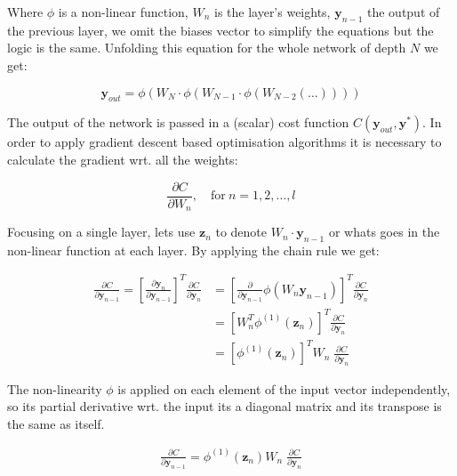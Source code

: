 \documentclass{article}
\begin{document}
    Where $\phi$ is a non-linear function, $W_n$ is the layer's weights, $\bm{y}_{n-1}$ the output of the previous layer, we omit the biases vector to simplify the equations but the logic is the same.
    Unfolding this equation for the whole network of depth $N$ we get:

    \begin{equation}
        \bm{y}_{out} = \phi ( W_{N} \cdot \phi(W_{N-1} \cdot  \phi(W_{N-2}( \dots ))))
    \end{equation}

    The output of the network is passed in a (scalar) cost function $C(\bm{y}_{out},\bm{y}^*)$.
    In order to apply gradient descent based optimisation algorithms it is necessary to calculate the gradient wrt.
    all the weights:

    \begin{equation}
        \frac{ \partial C}{\partial W_{n} }, \quad \text{for} \ n=1,2,\dots,l
    \end{equation}

    Focusing on a single layer, lets use $\textbf{z}_{n}$ to denote $W_{n}\cdot \textbf{y}_{n-1}$ or whats goes in the non-linear function at each layer.
    By applying the chain rule we get:

    \begin{align}
        \frac{ \partial C}{\partial \textbf{y}_{n-1} }
        =
        \left[ \frac{ \partial \textbf{y}_{n}}{\partial \textbf{y}_{n-1}  } \right]^T
        \frac{ \partial C}{\partial \textbf{y}_{n} }
        &=
        \left[ \frac{ \partial}{\partial \textbf{y}_{n-1} } \phi(W_n \textbf{y}_{n-1}) \right]^T
        \frac{ \partial C}{\partial \textbf{y}_{n} }
        \\
        &=
        \left[ W_n^T \phi^{(1)}( \pmb{z}_n ) \right]^T
        \frac{ \partial C}{\partial \textbf{y}_{n} }
        \\
        &=
        \left[ \phi^{(1)}( \pmb{z}_n ) \right]^T
        W_n \;
        \frac{ \partial C}{\partial \textbf{y}_{n} }
    \end{align}

    The non-linearity $\phi$ is applied on each element of the input vector independently, so its partial derivative wrt.
    the input its a diagonal matrix and its transpose is the same as itself.

    \begin{align}
        \frac{ \partial C}{\partial \textbf{y}_{n-1} }
        =
        \phi^{(1)}( \pmb{z}_n )
        W_n \;
        \frac{ \partial C}{\partial \textbf{y}_{n} }
        \label{dCdy}
    \end{align}
\end{document}

